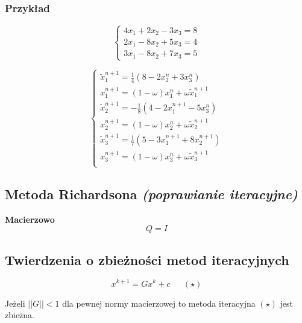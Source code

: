 \documentclass[../mn-notatki.tex]{subfiles}
\begin{document}
\subsubsection{Przykład}
\begin{table}[!htb]
    \begin{minipage}{.5\linewidth}
\[
\begin{cases}
4x_1 + 2x_2 - 3x_3 = 8\\
2x_1  - 8x_2 + 5x_3 = 4\\
3x_1 - 8x_2 + 7x_3 = 5
\end{cases}
\]
    \end{minipage}%
    \begin{minipage}{.5\linewidth}
\[
\begin{cases}
\tilde{x}_1^{n+1} =  \frac{1}{4} ( 8 - 2x_2^n + 3x_3^n  ) \\
x_1^{n+1} =  (1 -\omega)x_1^n + \omega \tilde{x}_1^{n+1} \\
\tilde{x}_2^{n+1} = -\frac{1}{8} ( 4 - 2x_1^{n+1} - 5x_3^n  ) \\
x_2^{n+1} =  (1 -\omega)x_2^n + \omega \tilde{x}_2^{n+1} \\
\tilde{x}_3^{n+1} =  \frac{1}{7} ( 5 - 3x_1^{n+1} + 8x_2^{n+1}  ) \\
x_3^{n+1} =  (1 -\omega)x_3^n + \omega \tilde{x}_3^{n+1} \\
\end{cases}
\]
    \end{minipage}%
\end{table}

\subsection{Metoda Richardsona \textit{(poprawianie iteracyjne)}}
\begin{tcolorbox}
\textbf{Macierzowo}
\[
Q = I
\]
\end{tcolorbox}

\subsection{Twierdzenia o zbieżności metod iteracyjnych}

\begin{tcolorbox}
\[
x^{k+1} = G x^k + c   ~~~~~~~(\star)
\]
\end{tcolorbox}

\begin{tcolorbox}
Jeżeli $||G|| < 1$ dla pewnej normy macierzowej to metoda iteracyjna $(\star)$
jest zbieżna.
\end{tcolorbox}
\end{document}
